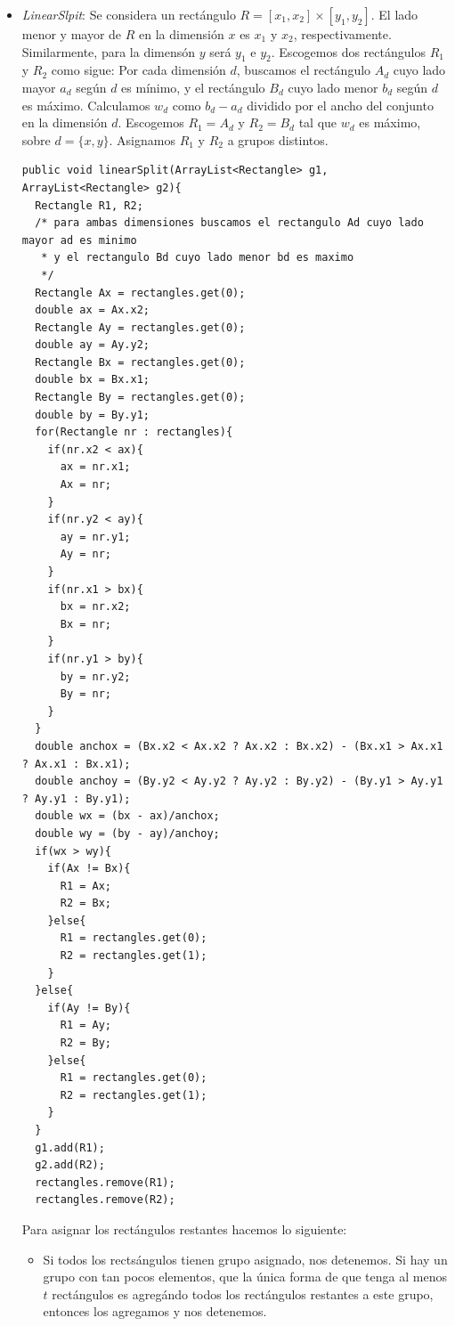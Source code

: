 \documentclass[letterpaper,12pt]{article}
\begin{document}
\begin{itemize}
\begin{itemize}
\end{itemize}

\item \textit{LinearSlpit}: Se considera un rect\'angulo $R = [x_1, x_2] \times [y_1, y_2]$. El lado menor y mayor de $R$ en la dimensi\'on $x$ es $x_1$ y $x_2$, respectivamente. Similarmente, para la dimens\'on $y$ ser\'a $y_1$ e $y_2$. Escogemos dos rect\'angulos $R_1$ y $R_2$ como sigue: Por cada dimensi\'on $d$, buscamos el rect\'angulo $A_d$ cuyo lado mayor $a_d$ seg\'un $d$ es m\'inimo, y el rect\'angulo $B_d$ cuyo lado menor $b_d$ seg\'un $d$ es m\'aximo. Calculamos $w_d$ como $b_d - a_d$ dividido por el ancho del conjunto en la dimensi\'on $d$. Escogemos $R_1 = A_d$ y $R_2 = B_d$ tal que $w_d$ es m\'aximo, sobre $d = \{x, y\}$. Asignamos $R_1$ y $R_2$ a grupos distintos.

\lstset{language=Java, breaklines=true, basicstyle=\footnotesize}
\begin{lstlisting}[frame=single]
public void linearSplit(ArrayList<Rectangle> g1, ArrayList<Rectangle> g2){
  Rectangle R1, R2;
  /* para ambas dimensiones buscamos el rectangulo Ad cuyo lado mayor ad es minimo
   * y el rectangulo Bd cuyo lado menor bd es maximo
   */
  Rectangle Ax = rectangles.get(0);
  double ax = Ax.x2;
  Rectangle Ay = rectangles.get(0);
  double ay = Ay.y2;
  Rectangle Bx = rectangles.get(0);
  double bx = Bx.x1;
  Rectangle By = rectangles.get(0);
  double by = By.y1;
  for(Rectangle nr : rectangles){
    if(nr.x2 < ax){
      ax = nr.x1;
      Ax = nr;
    }
    if(nr.y2 < ay){
      ay = nr.y1;
      Ay = nr;
    }
    if(nr.x1 > bx){
      bx = nr.x2;
      Bx = nr;
    }
    if(nr.y1 > by){
      by = nr.y2;
      By = nr;
    }
  }
  double anchox = (Bx.x2 < Ax.x2 ? Ax.x2 : Bx.x2) - (Bx.x1 > Ax.x1 ? Ax.x1 : Bx.x1);
  double anchoy = (By.y2 < Ay.y2 ? Ay.y2 : By.y2) - (By.y1 > Ay.y1 ? Ay.y1 : By.y1);
  double wx = (bx - ax)/anchox;
  double wy = (by - ay)/anchoy;
  if(wx > wy){
    if(Ax != Bx){
      R1 = Ax;
      R2 = Bx;
    }else{
      R1 = rectangles.get(0);
      R2 = rectangles.get(1);
    }
  }else{
    if(Ay != By){
      R1 = Ay;
      R2 = By;
    }else{
      R1 = rectangles.get(0);
      R2 = rectangles.get(1);
    }
  }
  g1.add(R1);
  g2.add(R2);
  rectangles.remove(R1);
  rectangles.remove(R2);
\end{lstlisting}

 Para asignar los rect\'angulos restantes hacemos lo siguiente:
\begin{itemize}
\item Si todos los rects\'angulos tienen grupo asignado, nos detenemos. Si hay un grupo con tan pocos elementos, que la \'unica forma de que tenga al menos $t$ rect\'angulos es agreg\'ando todos los rect\'angulos restantes a este grupo, entonces los agregamos y nos detenemos.


\end{itemize}
\end{itemize}
\end{document}

